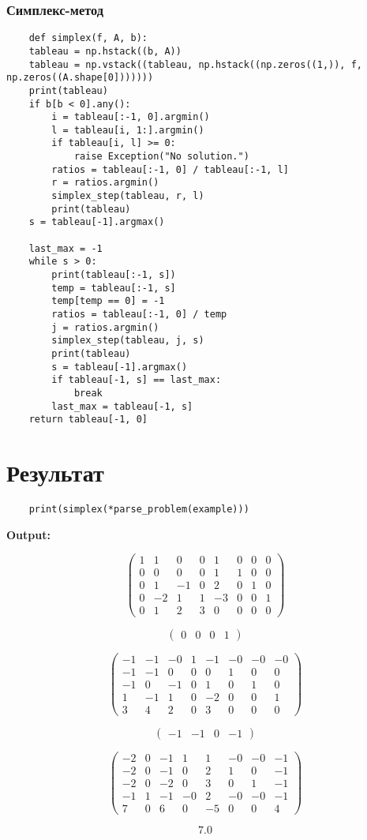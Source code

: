 \documentclass{article}
\begin{document}
\subsubsection{Симплекс-метод}
\begin{listing}[H]
    \begin{verbatim}
    def simplex(f, A, b):
    tableau = np.hstack((b, A))
    tableau = np.vstack((tableau, np.hstack((np.zeros((1,)), f, np.zeros((A.shape[0]))))))
    print(tableau)
    if b[b < 0].any():
        i = tableau[:-1, 0].argmin()
        l = tableau[i, 1:].argmin()
        if tableau[i, l] >= 0:
            raise Exception("No solution.")
        ratios = tableau[:-1, 0] / tableau[:-1, l]
        r = ratios.argmin()
        simplex_step(tableau, r, l)
        print(tableau)
    s = tableau[-1].argmax()

    last_max = -1
    while s > 0:
        print(tableau[:-1, s])
        temp = tableau[:-1, s]
        temp[temp == 0] = -1
        ratios = tableau[:-1, 0] / temp
        j = ratios.argmin()
        simplex_step(tableau, j, s)
        print(tableau)
        s = tableau[-1].argmax()
        if tableau[-1, s] == last_max:
            break
        last_max = tableau[-1, s]
    return tableau[-1, 0]
    \end{verbatim}
\end{listing}

\section{Результат}
\begin{listing}[H]
    \begin{verbatim}
    print(simplex(*parse_problem(example)))
    \end{verbatim}
\end{listing}

\textbf{Output:}

$$\begin{pmatrix}
1& 1& 0& 0& 1& 0& 0& 0\\
0& 0& 0& 0& 1& 1& 0& 0\\
0& 1&-1& 0& 2& 0& 1& 0\\
0&-2& 1& 1&-3& 0& 0& 1\\
0& 1& 2& 3& 0& 0& 0& 0
\end{pmatrix}$$

$$\begin{pmatrix}
0&0&0&1
\end{pmatrix}$$

$$\begin{pmatrix}
-1&-1&-0& 1&-1&-0&-0&-0\\
-1&-1& 0& 0& 0& 1& 0& 0\\
-1& 0&-1& 0& 1& 0& 1& 0\\
1&-1& 1& 0&-2& 0& 0& 1\\
3& 4& 2& 0& 3& 0& 0& 0
\end{pmatrix}$$

$$\begin{pmatrix}
-1&-1& 0&-1
\end{pmatrix}
$$

$$\begin{pmatrix}
-2& 0&-1& 1& 1&-0&-0&-1\\
-2& 0&-1& 0& 2& 1& 0&-1\\
-2& 0&-2& 0& 3& 0& 1&-1\\
-1& 1&-1&-0& 2&-0&-0&-1\\
7& 0& 6& 0&-5& 0& 0& 4
\end{pmatrix}$$

$$7.0$$
\end{document}
